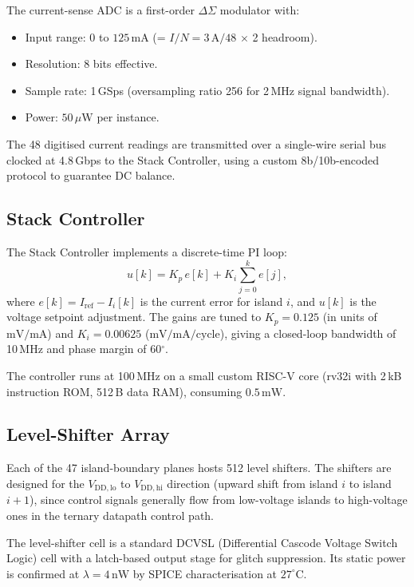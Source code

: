The current-sense ADC is a first-order $\Delta\Sigma$ modulator with:
\begin{itemize}
  \item Input range: $0$ to $125\,\mathrm{mA}$ (= $I/N = 3\,\mathrm{A}/48$ $\times$ 2 headroom).
  \item Resolution: 8 bits effective.
  \item Sample rate: 1\,GSps (oversampling ratio 256 for 2\,MHz signal bandwidth).
  \item Power: $50\,\mu\mathrm{W}$ per instance.
\end{itemize}
The 48 digitised current readings are transmitted over a
single-wire serial bus clocked at 4.8\,Gbps to the Stack Controller,
using a custom 8b/10b-encoded protocol to guarantee DC balance.

\subsection{Stack Controller}

The Stack Controller implements a discrete-time PI loop:
\[
  u[k] = K_p \, e[k] + K_i \sum_{j=0}^{k} e[j],
\]
where $e[k] = I_{\mathrm{ref}} - I_i[k]$ is the current error for island $i$,
and $u[k]$ is the voltage setpoint adjustment.  The gains are tuned
to $K_p = 0.125$ (in units of $\mathrm{mV/mA}$) and $K_i = 0.00625$
($\mathrm{mV/mA/cycle}$), giving a closed-loop bandwidth of 10\,MHz and
phase margin of 60$^\circ$.

The controller runs at 100\,MHz on a small custom RISC-V core (rv32i
with 2\,kB instruction ROM, 512\,B data RAM), consuming $0.5\,\mathrm{mW}$.

\subsection{Level-Shifter Array}

Each of the 47 island-boundary planes hosts 512 level shifters.
The shifters are designed for the $V_{\mathrm{DD,lo}}$ to $V_{\mathrm{DD,hi}}$
direction (upward shift from island $i$ to island $i+1$), since
control signals generally flow from low-voltage islands to high-voltage
ones in the ternary datapath control path.

The level-shifter cell is a standard DCVSL (Differential Cascode
Voltage Switch Logic) cell with a latch-based output stage for
glitch suppression.  Its static power is confirmed at
$\lambda = 4\,\mathrm{nW}$ by SPICE characterisation at $27^\circ$C.

